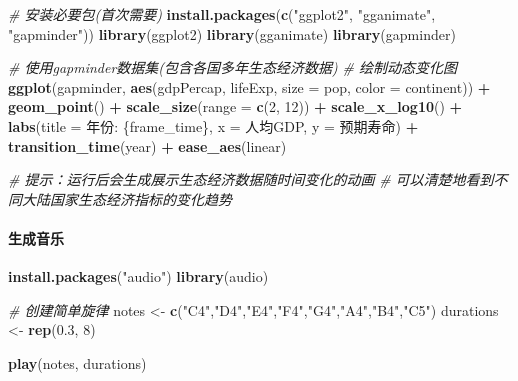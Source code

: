 \documentclass[
]{book}
\newenvironment{Shaded}{\begin{snugshade}}{\end{snugshade}}
\newcommand{\AttributeTok}[1]{\textcolor[rgb]{0.13,0.29,0.53}{#1}}
\newcommand{\CommentTok}[1]{\textcolor[rgb]{0.56,0.35,0.01}{\textit{#1}}}
\newcommand{\DecValTok}[1]{\textcolor[rgb]{0.00,0.00,0.81}{#1}}
\newcommand{\FloatTok}[1]{\textcolor[rgb]{0.00,0.00,0.81}{#1}}
\newcommand{\FunctionTok}[1]{\textcolor[rgb]{0.13,0.29,0.53}{\textbf{#1}}}
\newcommand{\NormalTok}[1]{#1}
\newcommand{\OtherTok}[1]{\textcolor[rgb]{0.56,0.35,0.01}{#1}}
\newcommand{\SpecialCharTok}[1]{\textcolor[rgb]{0.81,0.36,0.00}{\textbf{#1}}}
\newcommand{\StringTok}[1]{\textcolor[rgb]{0.31,0.60,0.02}{#1}}
\begin{document}
\begin{Shaded}
\begin{Highlighting}[]
\CommentTok{\# 安装必要包(首次需要)}
\FunctionTok{install.packages}\NormalTok{(}\FunctionTok{c}\NormalTok{(}\StringTok{"ggplot2"}\NormalTok{, }\StringTok{"gganimate"}\NormalTok{, }\StringTok{"gapminder"}\NormalTok{))}
\FunctionTok{library}\NormalTok{(ggplot2)}
\FunctionTok{library}\NormalTok{(gganimate)}
\FunctionTok{library}\NormalTok{(gapminder)}

\CommentTok{\# 使用gapminder数据集(包含各国多年生态经济数据)}
\CommentTok{\# 绘制动态变化图}
\FunctionTok{ggplot}\NormalTok{(gapminder, }\FunctionTok{aes}\NormalTok{(gdpPercap, lifeExp, }\AttributeTok{size =}\NormalTok{ pop, }\AttributeTok{color =}\NormalTok{ continent)) }\SpecialCharTok{+}
  \FunctionTok{geom\_point}\NormalTok{() }\SpecialCharTok{+}
  \FunctionTok{scale\_size}\NormalTok{(}\AttributeTok{range =} \FunctionTok{c}\NormalTok{(}\DecValTok{2}\NormalTok{, }\DecValTok{12}\NormalTok{)) }\SpecialCharTok{+}
  \FunctionTok{scale\_x\_log10}\NormalTok{() }\SpecialCharTok{+}
  \FunctionTok{labs}\NormalTok{(}\AttributeTok{title =} \StringTok{\textquotesingle{}年份: \{frame\_time\}\textquotesingle{}}\NormalTok{, }\AttributeTok{x =} \StringTok{\textquotesingle{}人均GDP\textquotesingle{}}\NormalTok{, }\AttributeTok{y =} \StringTok{\textquotesingle{}预期寿命\textquotesingle{}}\NormalTok{) }\SpecialCharTok{+}
  \FunctionTok{transition\_time}\NormalTok{(year) }\SpecialCharTok{+}
  \FunctionTok{ease\_aes}\NormalTok{(}\StringTok{\textquotesingle{}linear\textquotesingle{}}\NormalTok{)}

\CommentTok{\# 提示：运行后会生成展示生态经济数据随时间变化的动画}
\CommentTok{\# 可以清楚地看到不同大陆国家生态经济指标的变化趋势}
\end{Highlighting}
\end{Shaded}

\hypertarget{ux751fux6210ux97f3ux4e50}{%
\paragraph{生成音乐}\label{ux751fux6210ux97f3ux4e50}}

\begin{Shaded}
\begin{Highlighting}[]
\FunctionTok{install.packages}\NormalTok{(}\StringTok{"audio"}\NormalTok{)}
\FunctionTok{library}\NormalTok{(audio)}

\CommentTok{\# 创建简单旋律}
\NormalTok{notes }\OtherTok{\textless{}{-}} \FunctionTok{c}\NormalTok{(}\StringTok{"C4"}\NormalTok{,}\StringTok{"D4"}\NormalTok{,}\StringTok{"E4"}\NormalTok{,}\StringTok{"F4"}\NormalTok{,}\StringTok{"G4"}\NormalTok{,}\StringTok{"A4"}\NormalTok{,}\StringTok{"B4"}\NormalTok{,}\StringTok{"C5"}\NormalTok{)}
\NormalTok{durations }\OtherTok{\textless{}{-}} \FunctionTok{rep}\NormalTok{(}\FloatTok{0.3}\NormalTok{, }\DecValTok{8}\NormalTok{)}

\FunctionTok{play}\NormalTok{(notes, durations)}
\end{Highlighting}
\end{Shaded}
\end{document}
